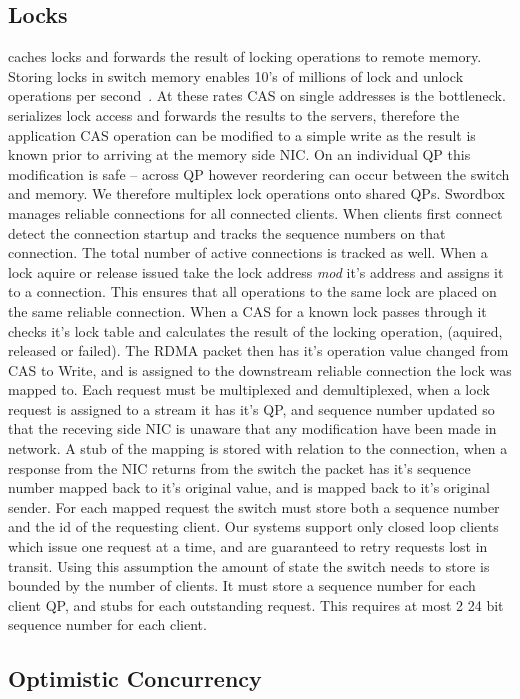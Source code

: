 \subsection{Locks}

\sword caches locks and forwards the result of locking
operations to remote memory. Storing locks in switch memory
enables 10's of millions of lock and unlock operations per
second~\cite{netlock}. At these rates CAS on single
addresses is the bottleneck. \swordbox serializes lock
access and forwards the results to the servers, therefore
the application CAS operation can be modified to a simple
write as the result is known prior to arriving at the memory
side NIC. On an individual QP this modification is safe --
across QP however reordering can occur between the switch
and memory. We therefore multiplex lock operations onto
shared QPs.
Swordbox manages reliable connections for all connected
clients. When clients first connect \sword detect the
connection startup and tracks the sequence numbers on that
connection. The total number of active connections is
tracked as well. When a lock aquire or release issued \sword
take the lock address \textit{mod} it's address and assigns
it to a connection. This ensures that all operations to the
same lock are placed on the same reliable connection.
When a CAS for a known lock passes through \sword it checks
it's lock table and calculates the result of the locking
operation, (aquired, released or failed). The RDMA packet
then has it's operation value changed from CAS to Write, and
is assigned to the downstream reliable connection the lock
was mapped to. Each request must be multiplexed and
demultiplexed, when a lock request is assigned to a stream
it has it's QP, and sequence number updated so that the
receving side NIC is unaware that any modification have been
made in network. A stub of the mapping is stored with
relation to the connection, when a response from the NIC
returns from the switch the packet has it's sequence number
mapped back to it's original value, and is mapped back to
it's original sender. For each mapped request the switch
must store both a sequence number and the id of the
requesting client. 
Our systems support only closed loop clients which issue one
request at a time, and are guaranteed to retry requests lost
in transit. Using this assumption the amount of state the
switch needs to store is bounded by the number of clients.
It must store a sequence number for each client QP, and
stubs for each outstanding request. This requires at most 2
24 bit sequence number for each client.

\subsection{Optimistic Concurrency}